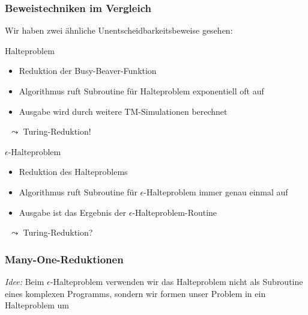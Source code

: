 \documentclass[onlymath]{beamer}
\begin{document}
\begin{frame}\frametitle{Beweistechniken im Vergleich}

Wir haben zwei ähnliche Unentscheidbarkeitsbeweise gesehen:\bigskip

\begin{minipage}{5cm}
\alert{Halteproblem}
\begin{itemize}
\item Reduktion der Busy-Beaver-Funktion
\item Algorithmus ruft Subroutine für Halteproblem exponentiell oft auf
\item Ausgabe wird durch weitere TM-Simulationen berechnet
\end{itemize}\bigskip
~\hspace{5mm}$\leadsto$ Turing-Reduktion!
\end{minipage}%
\begin{minipage}{5cm}
\alert{$\epsilon$-Halteproblem}
\begin{itemize}
\item Reduktion des Halteproblems
\item Algorithmus ruft Subroutine für $\epsilon$-Halteproblem immer genau einmal auf
\item Ausgabe ist das Ergebnis der $\epsilon$-Halteproblem-Routine
\end{itemize}\bigskip
~\hspace{5mm}$\leadsto$ Turing-Reduktion?
\end{minipage}

\end{frame}

\begin{frame}\frametitle{Many-One-Reduktionen}

\emph{Idee:} Beim $\epsilon$-Halteproblem verwenden wir das Halteproblem nicht als Subroutine eines komplexen Programms, sondern wir formen unser Problem in ein Halteproblem um\bigskip

\pause\bigskip



\end{frame}
\end{document}
